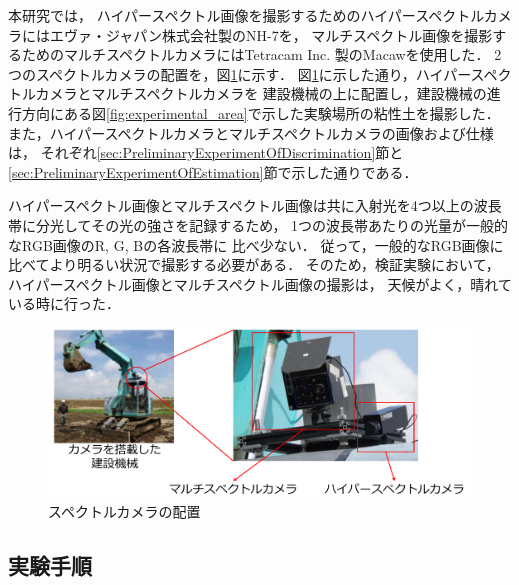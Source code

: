 \clearpage

本研究では，
ハイパースペクトル画像を撮影するためのハイパースペクトルカメラにはエヴァ・ジャパン株式会社製のNH-7を，
マルチスペクトル画像を撮影するためのマルチスペクトルカメラにはTetracam Inc. 製のMacawを使用した．
2つのスペクトルカメラの配置を，図\ref{fig:spectralcamera_arrangement}に示す．
図\ref{fig:spectralcamera_arrangement}に示した通り，ハイパースペクトルカメラとマルチスペクトルカメラを
建設機械の上に配置し，建設機械の進行方向にある図\ref{fig:experimental_area}で示した実験場所の粘性土を撮影した．
また，ハイパースペクトルカメラとマルチスペクトルカメラの画像および仕様は，
それぞれ\ref{sec:PreliminaryExperimentOfDiscrimination}節と\ref{sec:PreliminaryExperimentOfEstimation}節で示した通りである．

ハイパースペクトル画像とマルチスペクトル画像は共に入射光を4つ以上の波長帯に分光してその光の強さを記録するため，
1つの波長帯あたりの光量が一般的なRGB画像のR, G, Bの各波長帯に
比べ少ない．
従って，一般的なRGB画像に比べてより明るい状況で撮影する必要がある．
そのため，検証実験において，ハイパースペクトル画像とマルチスペクトル画像の撮影は，
天候がよく，晴れている時に行った．

\begin{figure}[b]
      \begin{center}
            \hspace{1.5cm}\includegraphics[width=13.5cm]{./Ch5_ConeIndexEstimation/Fig/spectralcamera_arrangement_Ver_2_compressed.pdf} %
            \caption{スペクトルカメラの配置}
            \label{fig:spectralcamera_arrangement}
      \end{center}
\end{figure}

\clearpage


\subsection{実験手順}
\label{ssec:ConeindexEstimationExperimentProcedure}

